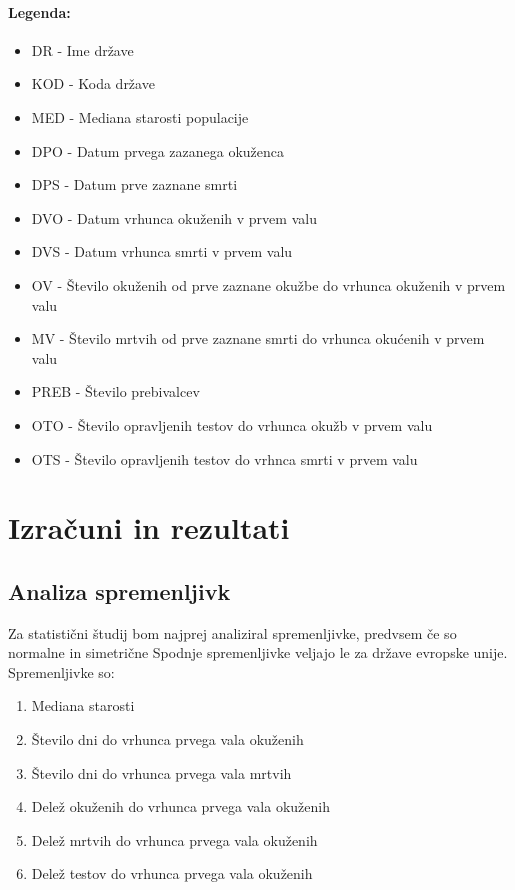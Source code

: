 \documentclass[a4paper,11pt]{article}
\begin{document}
\paragraph{Legenda:}

\begin{itemize}
\item{DR - Ime države}
\item{KOD - Koda države}
\item{MED - Mediana starosti populacije}
\item{DPO - Datum prvega zazanega okuženca}
\item{DPS - Datum prve zaznane smrti}
\item{DVO - Datum vrhunca okuženih v prvem valu}
\item{DVS - Datum vrhunca smrti v prvem valu}
\item{OV - Število okuženih od prve zaznane okužbe do vrhunca okuženih v prvem valu}
\item{MV - Število mrtvih od prve zaznane smrti do vrhunca okućenih v prvem valu}
\item{PREB - Število prebivalcev}
\item{OTO - Število opravljenih testov do vrhunca okužb v prvem valu}
\item{OTS - Število opravljenih testov do vrhnca smrti v prvem valu}
\end{itemize}

\section{Izračuni in rezultati}

\subsection{Analiza spremenljivk}
Za statistični študij bom najprej analiziral spremenljivke, predvsem če so normalne in simetrične Spodnje spremenljivke veljajo le za države evropske unije. Spremenljivke so:
\begin{enumerate}
\item{Mediana starosti}
\item{Število dni do vrhunca prvega vala okuženih}
\item{Število dni do vrhunca prvega vala mrtvih}
\item{Delež okuženih do vrhunca prvega vala okuženih}
\item{Delež mrtvih do vrhunca prvega vala okuženih}
\item{Delež testov do vrhunca prvega vala okuženih}
\end{enumerate}
\end{document}
